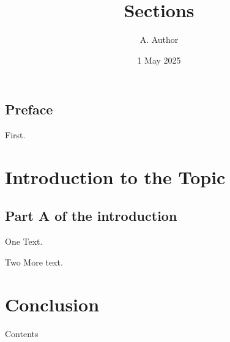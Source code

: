 \documentclass{beamer}
\title{Sections}
\author{A. Author}
\date{1 May 2025}
\begin{document}
\subsection{Preface}
\begin{frame}
First.
\end{frame}
\section[Intro]{Introduction to the Topic}
\subsection[A]{Part A of the introduction}
\begin{frame}{One}
Text.
\end{frame}
\begin{frame}{Two}
More text.
\end{frame}
\section{Conclusion}
\begin{frame}{Contents}
\tableofcontents
\end{frame}
\end{document}
